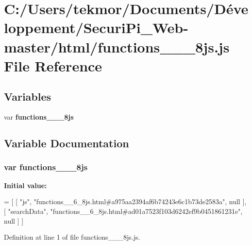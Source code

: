 \section{C\+:/\+Users/tekmor/\+Documents/\+Développement/\+Securi\+Pi\+\_\+\+Web-\/master/html/functions\+\_\+\+\_\+\_\+8js.js File Reference}
\label{functions____6__8js_8js}
\subsection*{Variables}
\begin{DoxyCompactItemize}
\item 
var {\bf functions\+\_\+\+\_\+\_\+8js}
\end{DoxyCompactItemize}


\subsection{Variable Documentation}
\subsubsection[{functions\+\_\+\+\_\+6\+\_\+8js}]{\setlength{\rightskip}{0pt plus 5cm}var functions\+\_\+\+\_\+\_\+8js}\label{functions____6__8js_8js_a979006b94a40236d6a5bfcc83ab469a7}
{\bfseries Initial value\+:}
\begin{DoxyCode}
=
[
    [ \textcolor{stringliteral}{"js"}, \textcolor{stringliteral}{"functions\_\_6\_8js.html#a975aa2394af6b74243e6c1b73de2583a"}, null ],
    [ \textcolor{stringliteral}{"searchData"}, \textcolor{stringliteral}{"functions\_\_6\_8js.html#ad01a7523f103d6242ef9b0451861231e"}, null ]
]
\end{DoxyCode}


Definition at line 1 of file functions\+\_\+\+\_\+\_\+8js.\+js.

